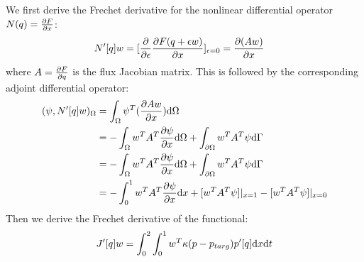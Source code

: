 \documentclass[a4paper]{article}
\begin{document}
We first derive the Frechet derivative for the nonlinear differential operator $N(q) = \frac{\partial {F}}{\partial{x}}$:
\begin{equation}
\begin{aligned}
N'[q]w &= [\frac{\partial}{\partial \epsilon}
\frac{\partial {F(q+\epsilon w)}}{\partial{x}}]_{\epsilon=0} 
= \frac{\partial {(Aw)}}{\partial{x}}
\end{aligned}
\end{equation}
where $A=\frac{\partial {F}}{\partial{q}}$ is the flux Jacobian matrix. This is
followed by the corresponding adjoint differential operator:
\begin{equation}
\begin{aligned}
(\psi, N'[q]w)_{\Omega} &= \int_{\Omega} \psi^T (\frac{\partial {Aw}}{\partial{x}})\mathrm{d}\Omega  \\
&= -\int_{\Omega} w^TA^T\frac{\partial {\psi}}{\partial{x}}\mathrm{d}\Omega + \int_{\partial\Omega}w^TA^T\psi\mathrm{d}\Gamma \\
&= -\int_{\Omega} w^TA^T\frac{\partial {\psi}}{\partial{x}}\mathrm{d}\Omega +  \int_{\partial\Omega}w^TA^T\psi\mathrm{d}\Gamma \\
&= -\int_{0}^{1} w^TA^T\frac{\partial {\psi}}{\partial{x}}\mathrm{d} x + [w^T A^T\psi]|_{x=1} - [w^T A^T\psi]|_{x=0}
\end{aligned}
\end{equation}
Then we derive the Frechet derivative of the functional:
\begin{equation}
J'[q]w = \int_{0}^{2}\int_{0}^{1}w^T \kappa(p-p_{targ})p'[q] \mathrm{d} x\mathrm{d} t
\end{equation}
\end{document}
